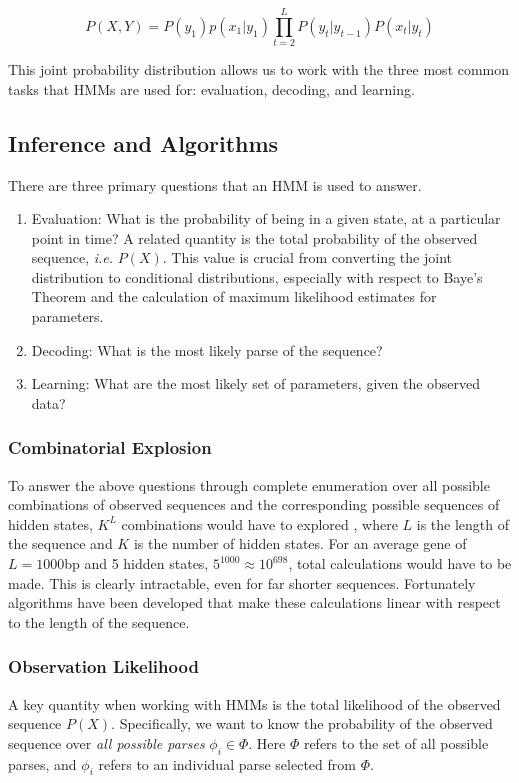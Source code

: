 \begin{equation}
    P(X,Y) = P(y_1)p(x_1|y_1)\prod_{t=2}^L{P(y_t|y_{t-1})P(x_t|y_t)}
\label{eq:jointhmm}
\end{equation}

This joint probability distribution allows us to work with the three most common tasks that HMMs are used for: evaluation, decoding, and learning.
\subsection{Inference and Algorithms}
There are three primary questions that an HMM is used to answer. 

\begin{enumerate}
    \item Evaluation: What is the probability of being in a given state, at a particular point in time? A related quantity is the total probability of the observed sequence, \emph{i.e.} $P(X)$. This value is crucial from converting the joint distribution to conditional distributions, especially with respect to Baye's Theorem and the calculation of maximum likelihood estimates for parameters.
    \item Decoding: What is the most likely parse of the sequence? 
    \item Learning: What are the most likely set of parameters, given the observed data?
\end{enumerate}

\subsubsection{Combinatorial Explosion}
To answer the above questions through complete enumeration over all possible combinations of observed sequences and the corresponding possible sequences of hidden states, $K^L$ combinations would have to explored \cite{Rabiner1989ARecognition}, where $L$ is the length of the sequence and $K$ is the number of hidden states. For an average gene of $L=1000$bp and 5 hidden states, $5^{1000}\approx10^{698}$, total calculations would have to be made. This is clearly intractable, even for far shorter sequences. Fortunately algorithms have been developed that make these calculations linear with respect to the length of the sequence.
\subsubsection{Observation Likelihood}
A key quantity when working with HMMs is the total likelihood of the observed sequence $P(X)$. Specifically, we want to know the probability of the observed sequence over \emph{all possible parses} $\phi_i \in \Phi$. Here $\Phi$ refers to the set of all possible parses, and $\phi_i$ refers to an individual parse selected from $\Phi$. 

